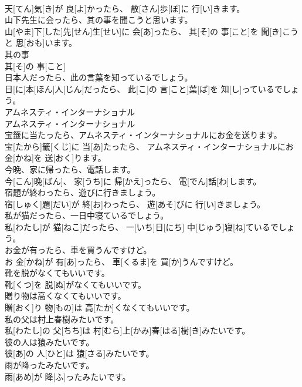 \documentclass[8pt]{extreport}
\begin{document}
\begin{CJK}{UTF8}{min}
\\	天[てん]気[き]が 良[よ]かったら、 散[さん]歩[ぽ]に 行[い]きます。
\\	山下先生に会ったら、其の事を聞こうと思います。	
\\	山[やま]下[した]先[せん]生[せい]に 会[あ]ったら、 其[そ]の 事[こと]を 聞[き]こうと 思[おも]います。
\\	其の事	
\\	其[そ]の 事[こと]	
\\	日本人だったら、此の言葉を知っているでしょう。	
\\	日[に]本[ほん]人[じん]だったら、 此[こ]の 言[こと]葉[ば]を 知[し]っているでしょう。
\\	アムネスティ・インターナショナル	
\\	アムネスティ・インターナショナル	
\\	宝籤に当たったら、アムネスティ・インターナショナルにお金を送ります。	
\\	宝[たから]籤[くじ]に 当[あ]たったら、 アムネスティ・インターナショナルにお 金[かね]を 送[おく]ります。
\\	今晩、家に帰ったら、電話します。	
\\	今[こん]晩[ばん]、 家[うち]に 帰[かえ]ったら、 電[でん]話[わ]します。
\\	宿題が終わったら、遊びに行きましょう。	
\\	宿[しゅく]題[だい]が 終[お]わったら、 遊[あそ]びに 行[い]きましょう。
\\	私が猫だったら、一日中寝ているでしょう。	
\\	私[わたし]が 猫[ねこ]だったら、 一[いち]日[にち] 中[じゅう]寝[ね]ているでしょう。
\\	お金が有ったら、車を買うんですけど。	
\\	お 金[かね]が 有[あ]ったら、 車[くるま]を 買[か]うんですけど。
\\	靴を脱がなくてもいいです。	
\\	靴[くつ]を 脱[ぬ]がなくてもいいです。
\\	贈り物は高くなくてもいいです。	
\\	贈[おく]り 物[もの]は 高[たか]くなくてもいいです。
\\	私の父は村上春樹みたいです。	
\\	私[わたし]の 父[ちち]は 村[むら]上[かみ]春[はる]樹[き]みたいです。
\\	彼の人は猿みたいです。	
\\	彼[あ]の 人[ひと]は 猿[さる]みたいです。
\\	雨が降ったみたいです。	
\\	雨[あめ]が 降[ふ]ったみたいです。

\end{CJK}
\end{document}

